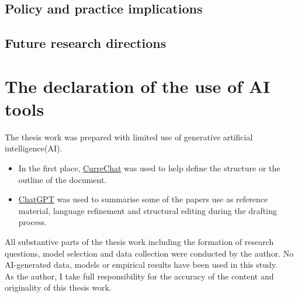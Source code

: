 \documentclass[12pt]{report}
\begin{document}
\section{Policy and practice implications}
\section{Future research directions}




\appendix
\chapter{The declaration of the use of AI tools}

The thesis work was prepared with limited use of generative artificial intelligence(AI).
\begin{itemize}
    \item In the first place, \href{https://curre.helsinki.fi/chat/general}{CurreChat} was used to help define the structure or the outline of the document.
    \item \href{https://chatgpt.com/}{ChatGPT} was used to summarise some of the papers use as reference material, language refinement and structural editing during the drafting process.
\end{itemize}
All substantive parts of the thesis work including the formation of research questions, model selection and data collection were conducted by the author. No AI-generated data, models or empirical results have been used in this study.\\
As the author, I take full responsibility for the accuracy of the content and originality of this thesis work.




\end{document}
